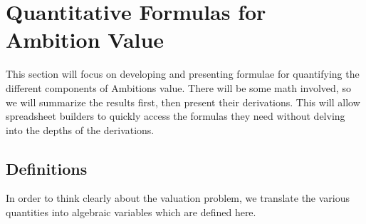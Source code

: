 \documentclass[paper=a4, fontsize=11pt abstract]{scrartcl}
\numberwithin{equation}{section}		%
\numberwithin{figure}{section}			%
\numberwithin{table}{section}				%
\begin{document}
\section{Quantitative Formulas for Ambition Value}
This section will focus on developing and presenting formulae for quantifying the different components of Ambitions value.  There will be some math involved, so we will summarize the results first, then present their derivations.  This will allow spreadsheet builders to quickly access the formulas they need without delving into the depths of the derivations.

\subsection{Definitions}
In order to think clearly about the valuation problem, we translate the various quantities into algebraic variables which are defined here.
\end{document}

